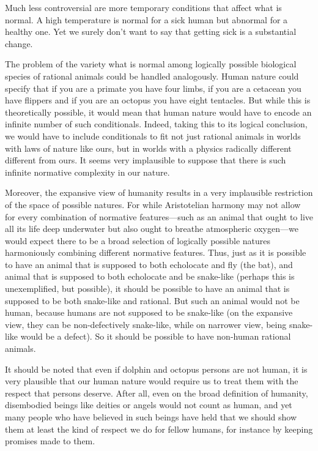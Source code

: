 Much less controversial are more temporary conditions that affect what is normal. A high temperature is normal for a sick human but abnormal for a
healthy one. Yet we surely don't want to say that getting sick is a substantial change. 

The problem of the variety what is normal among logically possible biological species of rational animals could be handled analogously. 
Human nature could specify that if you are a primate you have four limbs, if you are a cetacean you have flippers and if you are an octopus you have
eight tentacles. But while this is theoretically possible, it would mean that human nature would have to encode an infinite number of such conditionals.
Indeed, taking this to its logical conclusion, we would have to include conditionals to fit not just rational animals in worlds with laws of nature like ours,
but in worlds with a physics radically different different from ours. It seems very implausible to suppose that there is such infinite normative complexity
in our nature.

Moreover, the expansive view of humanity results in a very implausible restriction of the space of possible natures. For while Aristotelian harmony may not
allow for every combination of normative features---such as an animal that ought to live all its life deep underwater but also ought to breathe atmospheric 
oxygen---we would expect there to be a broad selection of logically possible natures harmoniously combining different normative features. Thus, just as it
is possible to have an animal that is supposed to both echolocate and fly (the bat), and animal that is supposed to both echolocate and be snake-like (perhaps
this is unexemplified, but possible), it should
be possible to have an animal that is supposed to be both snake-like and rational. But such an animal would not be human, because humans are not supposed
to be snake-like (on the expansive view, they can be non-defectively snake-like, while on narrower view, being snake-like would be a defect). So it should
be possible to have non-human rational animals.

It should be noted that even if dolphin and octopus persons are not human, it is very plausible that our human nature would require us to treat them with the
respect that persons deserve. After all, even on the broad definition of humanity, disembodied beings like deities or angels would not count as human, and yet
many people who have believed in such beings have held that we should show them at least the kind of respect we do for fellow humans, for instance by keeping
promises made to them.

